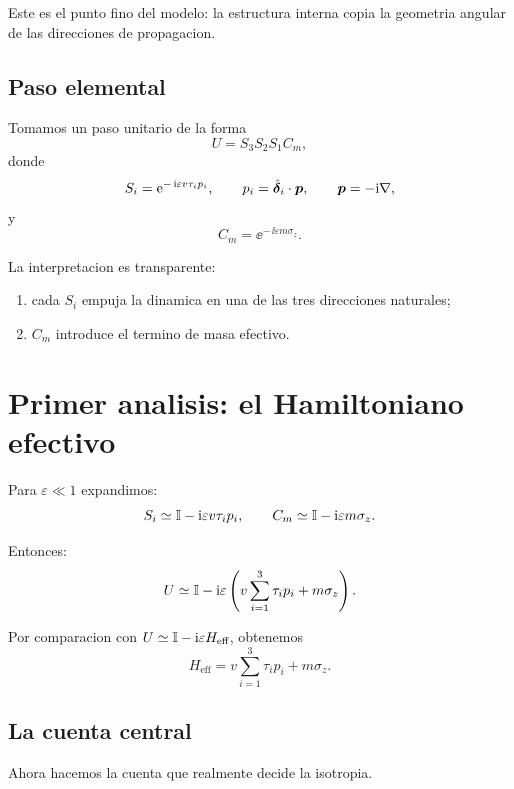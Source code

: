 Este es el punto fino del modelo: la estructura interna copia la geometria angular de las direcciones de propagacion.

\subsection{Paso elemental}
Tomamos un paso unitario de la forma
\begin{equation}
U = S_3 S_2 S_1 C_m,
\label{c05:eq:U}
\end{equation}
donde
\begin{equation}
S_i = \mathrm{e}^{-\,\mathrm{i} \varepsilon v \tau_i p_i},
\qquad
p_i = \hat{\bm{\delta}}_i\cdot \bm{p},
\qquad
\bm{p} = -\mathrm{i} \nabla,
\label{c05:eq:Si}
\end{equation}
y
\begin{equation}
C_m = \ee^{-\,\ii \varepsilon m \sigma_z}.
\label{c05:eq:Cm}
\end{equation}

La interpretacion es transparente:
\begin{enumerate}[label=\arabic*.]
    \item cada \(S_i\) empuja la dinamica en una de las tres direcciones naturales;
    \item \(C_m\) introduce el termino de masa efectivo.
\end{enumerate}

\section{Primer analisis: el Hamiltoniano efectivo}
Para \(\varepsilon\ll 1\) expandimos:
\begin{equation}
S_i \simeq \mathbb{I} - \mathrm{i} \varepsilon v \tau_i p_i,
\qquad
C_m \simeq \mathbb{I} - \mathrm{i} \varepsilon m \sigma_z.
\end{equation}

Entonces:
\begin{equation}
U \simeq \mathbb{I} - \mathrm{i} \varepsilon
\left(
v\sum_{i=1}^3 \tau_i p_i + m\sigma_z
\right).
\end{equation}

Por comparacion con \(U\simeq \mathbb{I} - \mathrm{i}\varepsilon H_{\text{eff}}\), obtenemos
\begin{equation}
H_{\text{eff}} =
v\sum_{i=1}^3 \tau_i p_i + m\sigma_z.
\label{c05:eq:Heffraw}
\end{equation}

\subsection{La cuenta central}
Ahora hacemos la cuenta que realmente decide la isotropia.

